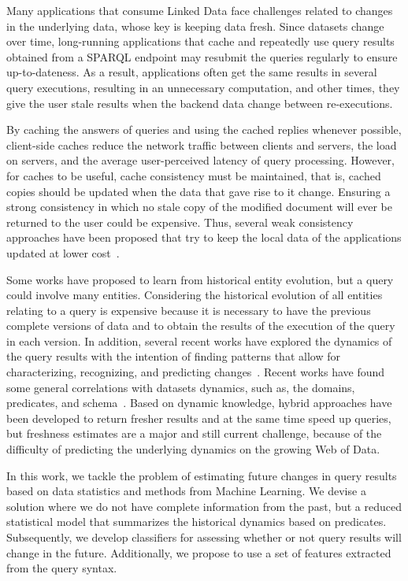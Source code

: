 \documentclass[runningheads]{llncs}
\begin{document}
Many applications that consume Linked Data face challenges related to changes in the underlying data, whose key is keeping data fresh. Since datasets change over time, long-running applications that cache and repeatedly use query results obtained from a SPARQL endpoint may resubmit the queries regularly to ensure up-to-dateness. As a result, applications often get the same results in several query executions, resulting in an unnecessary computation, and other times, they give the user stale results when the backend data change between re-executions. 

By caching the answers of queries and using the cached replies whenever possible, client-side caches reduce the network traffic between clients and servers, the load on servers, and the average user-perceived latency of query processing. However, for caches to be useful, cache consistency must be maintained, that is, cached copies should be updated when the data that gave rise to it change.
Ensuring a strong consistency in which no stale copy of the modified document will ever be returned to the user could be expensive. Thus, several weak consistency approaches have been proposed that try to keep the local data of the applications updated at lower cost~\cite{KnuthHS16,DividinoGS15,NishiokaS17}.

Some works have proposed to learn from historical entity evolution, but a query could involve many entities. Considering the historical evolution of all entities relating to a query is expensive because it is necessary to have the previous complete versions of data and to obtain the results of the execution of the query in each version. In addition, several recent works have explored the dynamics of the query results with the intention of finding patterns that allow for characterizing, recognizing, and predicting changes~\cite{KaferAUOH13,NishiokaS16,GonzalezH18}. Recent works have found some general correlations with datasets dynamics, such as, the domains, predicates, and schema~\cite{KaferAUOH13,NishiokaS17,UmbrichHHPD10}. Based on dynamic knowledge, hybrid approaches have been developed to return fresher results and at the same time speed up queries, but freshness estimates are a major and still current challenge, because of the difficulty of predicting the underlying dynamics on the growing Web of Data.

In this work, we tackle the problem of estimating future changes in query results based on data statistics and methods from Machine Learning. We devise a solution where we do not have complete information from the past, but a reduced statistical model that summarizes the historical dynamics based on predicates. Subsequently, we develop classifiers for assessing whether or not query results will change in the future. Additionally, we propose to use a set of features extracted from the query syntax.
\end{document}
